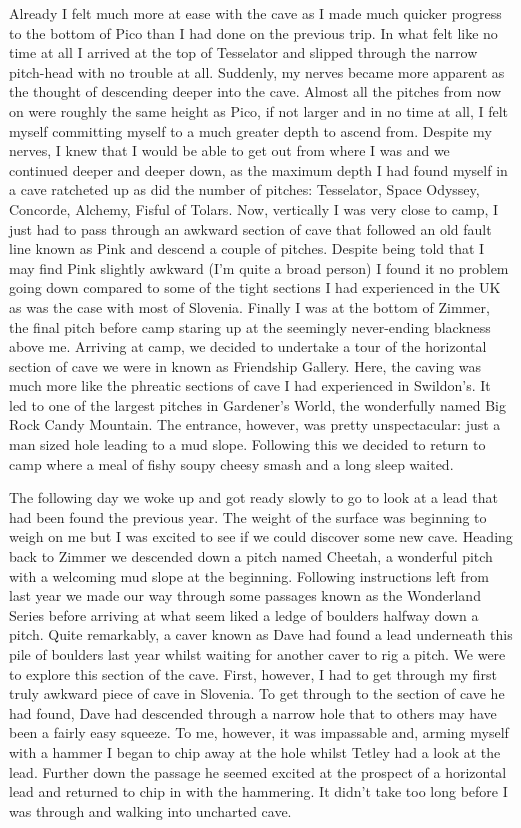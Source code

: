 Already I felt much more at ease with the cave as I made much quicker
progress to the bottom of Pico than I had done on the previous trip. In
what felt like no time at all I arrived at the top of Tesselator and
slipped through the narrow pitch-head with no trouble at all. Suddenly,
my nerves became more apparent as the thought of descending deeper into
the cave. Almost all the pitches from now on were roughly the same
height as Pico, if not larger and in no time at all, I felt myself
committing myself to a much greater depth to ascend from. Despite my
nerves, I knew that I would be able to get out from where I was and we
continued deeper and deeper down, as the maximum depth I had found
myself in a cave ratcheted up as did the number of pitches: Tesselator,
Space Odyssey, Concorde, Alchemy, Fisful of Tolars. Now, vertically I
was very close to camp, I just had to pass through an awkward section of
cave that followed an old fault line known as Pink and descend a couple
of pitches. Despite being told that I may find Pink slightly awkward
(I'm quite a broad person) I found it no problem going down compared to
some of the tight sections I had experienced in the UK as was the case
with most of Slovenia. Finally I was at the bottom of Zimmer, the final
pitch before camp staring up at the seemingly never-ending blackness
above me. Arriving at camp, we decided to undertake a tour of the
horizontal section of cave we were in known as Friendship Gallery. Here,
the caving was much more like the phreatic sections of cave I had
experienced in Swildon's. It led to one of the largest pitches in
Gardener's World, the wonderfully named Big Rock Candy Mountain. The
entrance, however, was pretty unspectacular: just a man sized hole
leading to a mud slope. Following this we decided to return to camp
where a meal of fishy soupy cheesy smash and a long sleep waited.

The following day we woke up and got ready slowly to go to look at a
lead that had been found the previous year. The weight of the surface
was beginning to weigh on me but I was excited to see if we could
discover some new cave. Heading back to Zimmer we descended down a pitch
named Cheetah, a wonderful pitch with a welcoming mud slope at the
beginning. Following instructions left from last year we made our way
through some passages known as the Wonderland Series before arriving at
what seem liked a ledge of boulders halfway down a pitch. Quite
remarkably, a caver known as Dave had found a lead underneath this pile
of boulders last year whilst waiting for another caver to rig a pitch.
We were to explore this section of the cave. First, however, I had to
get through my first truly awkward piece of cave in Slovenia. To get
through to the section of cave he had found, Dave had descended through
a narrow hole that to others may have been a fairly easy squeeze. To me,
however, it was impassable and, arming myself with a hammer I began to
chip away at the hole whilst Tetley had a look at the lead. Further down
the passage he seemed excited at the prospect of a horizontal lead and
returned to chip in with the hammering. It didn't take too long before I
was through and walking into uncharted cave.

